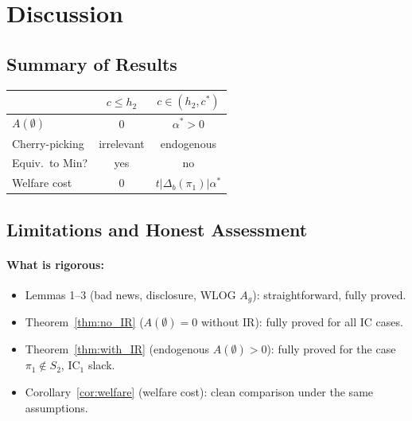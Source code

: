 \documentclass[12pt,a4paper]{article}
\begin{document}
\section{Discussion}
\label{sec:discussion}

\subsection{Summary of Results}

\begin{center}
\renewcommand{\arraystretch}{1.3}
\begin{tabular}{l|c|c}
& \textbf{$c \leq h_2$} & \textbf{$c \in (h_2, c^*)$} \\
\hline
$A(\emptyset)$ & $0$ & $\alpha^* > 0$ \\
Cherry-picking & irrelevant & endogenous \\
Equiv.\ to Min? & yes & no \\
Welfare cost & $0$ & $t|\Delta_b(\pi_1)|\alpha^*$
\end{tabular}
\end{center}


\subsection{Limitations and Honest Assessment}

\paragraph{What is rigorous:}
\begin{itemize}
  \item Lemmas 1--3 (bad news, disclosure, WLOG $A_g$):
    straightforward, fully proved.
  \item Theorem~\ref{thm:no_IR} ($A(\emptyset) = 0$
    without IR): fully proved for all IC cases.
  \item Theorem~\ref{thm:with_IR} (endogenous
    $A(\emptyset) > 0$): fully proved for the case
    $\pi_1 \notin S_2$, $\mathrm{IC}_1$ slack.
  \item Corollary~\ref{cor:welfare} (welfare cost):
    clean comparison under the same assumptions.
\end{itemize}
\end{document}
